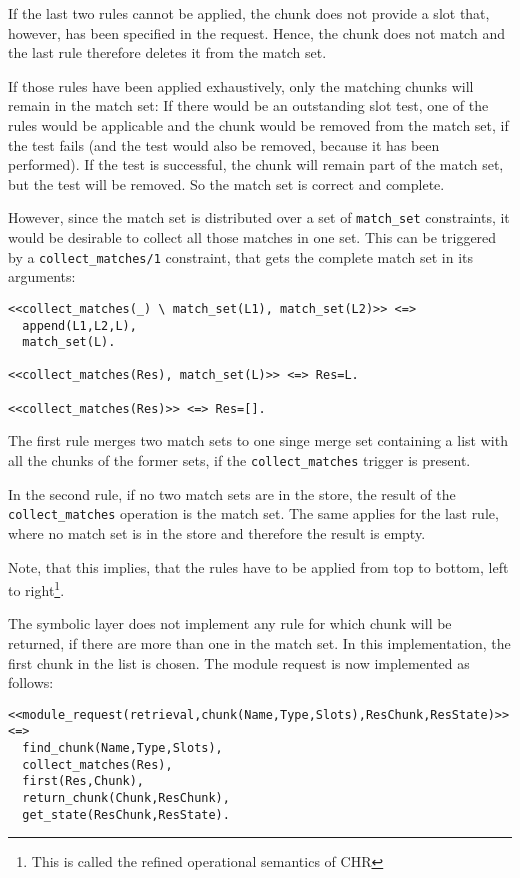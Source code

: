If the last two rules cannot be applied, the chunk does not provide a slot that, however, has been specified in the request. Hence, the chunk does not match and the last rule therefore deletes it from the match set. 

If those rules have been applied exhaustively, only the matching chunks will remain in the match set: If there would be an outstanding slot test, one of the rules would be applicable and the chunk would be removed from the match set, if the test fails (and the test would also be removed, because it has been performed). If the test is successful, the chunk will remain part of the match set, but the test will be removed. So the match set is correct and complete.

However, since the match set is distributed over a set of \verb|match_set| constraints, it would be desirable to collect all those matches in one set. This can be triggered by a \verb|collect_matches/1| constraint, that gets the complete match set in its arguments:

\begin{lstlisting}
<<collect_matches(_) \ match_set(L1), match_set(L2)>> <=> 
  append(L1,L2,L), 
  match_set(L).
  
<<collect_matches(Res), match_set(L)>> <=> Res=L.

<<collect_matches(Res)>> <=> Res=[].
\end{lstlisting}

The first rule merges two match sets to one singe merge set containing a list with all the chunks of the former sets, if the \verb|collect_matches| trigger is present. 

In the second rule, if no two match sets are in the store, the result of the \verb|collect_matches| operation is the match set. The same applies for the last rule, where no match set is in the store and therefore the result is empty.

Note, that this implies, that the rules have to be applied from top to bottom, left to right\footnote{This is called the refined operational semantics of CHR}.

The symbolic layer does not implement any rule for which chunk will be returned, if there are more than one in the match set. In this implementation, the first chunk in the list is chosen. The module request is now implemented as follows:

\begin{lstlisting}
<<module_request(retrieval,chunk(Name,Type,Slots),ResChunk,ResState)>> <=> 
  find_chunk(Name,Type,Slots),
  collect_matches(Res),
  first(Res,Chunk),
  return_chunk(Chunk,ResChunk),
  get_state(ResChunk,ResState).
\end{lstlisting}

